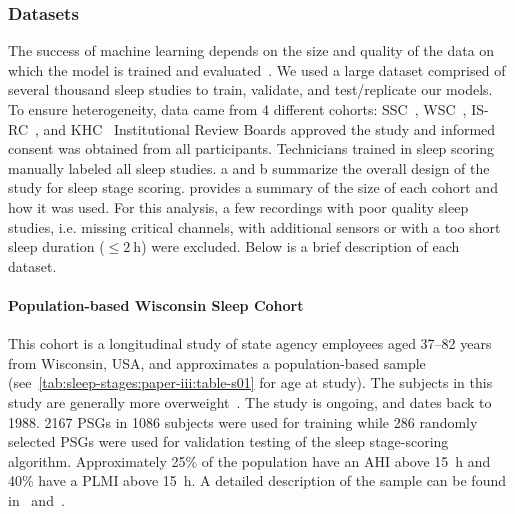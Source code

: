 \subsubsection{Datasets}
The success of machine learning depends on the size and quality of the data on which the model is trained and evaluated~\cite{Banko2001, Shotton2011}.
We used a large dataset comprised of several thousand sleep studies to train, validate, and test/replicate our models.
To ensure heterogeneity, data came from 4 different cohorts: \ac{SSC}~\cite{Andlauer2013, Moore2014}, \ac{WSC}~\cite{Moore2014, Young2009}, \ac{IS-RC}~\cite{Kuna2013}, and \ac{KHC}~\cite{Hong2006}
Institutional Review Boards approved the study and informed consent was obtained from all participants.
Technicians trained in sleep scoring manually labeled all sleep studies.
a and b summarize the overall design of the study for sleep stage scoring.
 provides a summary of the size of each cohort and how it was used.
For this analysis, a few recordings with poor quality sleep studies, i.e. missing critical channels, with additional sensors or with a too short sleep duration ($\leq \SI{2}{\hour}$) were excluded.
Below is a brief description of each dataset.

\paragraph{Population-based Wisconsin Sleep Cohort}
This cohort is a longitudinal study of state agency employees aged 37--82 years from Wisconsin, USA, and approximates a population-based sample (see~\cref{tab:sleep-stages:paper-iii:table-s01} for age at study).
The subjects in this study are generally more overweight~\cite{Young2009}.
The study is ongoing, and dates back to 1988.
2167 \acp{PSG} in 1086 subjects were used for training while 286 randomly selected \acp{PSG} were used for validation testing of the sleep stage-scoring algorithm.%
Approximately 25\% of the population have an \ac{AHI} above \SI{15}{\hour} and 40\% have a \ac{PLMI} above \SI{15}{\hour}.
A detailed description of the sample can be found in~\cite{Young2009} and~\cite{Moore2014}.

